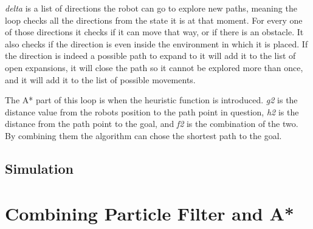 \emph{delta} is a list of directions the robot can go to explore new paths, meaning the loop checks all the directions from the state it is at that moment. For every one of those directions it checks if it can move that way, or if there is an obstacle. It also checks if the direction is even inside the environment in which it is placed. If the direction is indeed a possible path to expand to it will add it to the list of open expansions, it will close the path so it cannot be explored more than once, and it will add it to the list of possible movements.

The A* part of this loop is when the heuristic function is introduced. \emph{g2} is the distance value from the robots position to the path point in question, \emph{h2} is the distance from the path point to the goal, and \emph{f2} is the combination of the two. By combining them the algorithm can chose the shortest path to the goal.

\subsection{Simulation}



\section{Combining Particle Filter and A*}